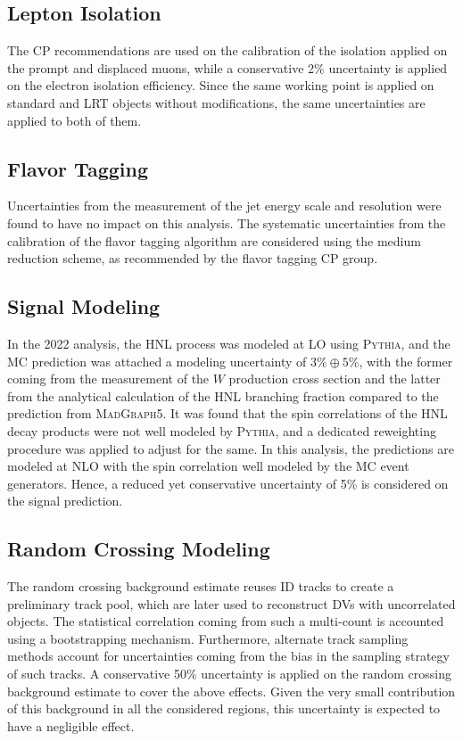 \subsection*{Lepton Isolation}
The CP recommendations are used on the calibration of the isolation applied on the prompt and displaced muons, while a conservative 2\% uncertainty is applied on the electron isolation efficiency. Since the same working point is applied on standard and LRT objects without modifications, the same uncertainties are applied to both of them.

\subsection*{Flavor Tagging}
Uncertainties from the measurement of the jet energy scale and resolution were found to have no impact on this analysis. The systematic uncertainties from the calibration of the flavor tagging algorithm are considered using the medium reduction scheme, as recommended by the flavor tagging CP group.

\subsection*{Signal Modeling}
In the 2022 analysis, the HNL process was modeled at LO using \textsc{Pythia}, and the MC prediction was attached a modeling uncertainty of $3\% \oplus 5\%$, with the former coming from the measurement of the $W$ production cross section and the latter from the analytical calculation of the HNL branching fraction compared to the prediction from \textsc{MadGraph5}. It was found that the spin correlations of the HNL decay products were not well modeled by \textsc{Pythia}, and a dedicated reweighting procedure was applied to adjust for the same. In this analysis, the predictions are modeled at NLO with the spin correlation well modeled by the MC event generators. Hence, a reduced yet conservative uncertainty of 5\% is considered on the signal prediction.

\subsection*{Random Crossing Modeling}
The random crossing background estimate reuses ID tracks to create a preliminary track pool, which are later used to reconstruct DVs with uncorrelated objects. The statistical correlation coming from such a multi-count is accounted using a bootstrapping mechanism. Furthermore, alternate track sampling methods account for uncertainties coming from the bias in the sampling strategy of such tracks. A conservative 50\% uncertainty is applied on the random crossing background estimate to cover the above effects. Given the very small contribution of this background in all the considered regions, this uncertainty is expected to have a negligible effect.


